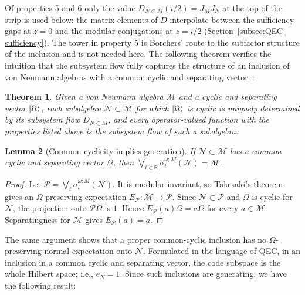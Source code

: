 \documentclass[a4paper,11pt]{article}
\newtheorem{theorem}{Theorem}
\newtheorem{lemma}[theorem]{Lemma}
\theoremstyle{definition}
\newcommand{\mP}{\mathcal{P}}
\begin{document}
Of properties 5 and 6 only the value $D_{N\subset M}(i/2)=J_MJ_N$ at the top of the strip is used below: the matrix elements of $D$ interpolate between the sufficiency gaps at $z=0$ and the modular conjugations at $z=i/2$ (Section~\ref{subsec:QEC-sufficiency}). The tower in property 5 is Borchers' route to the subfactor structure of the inclusion and is not needed here. The following theorem verifies the intuition that the subsystem flow fully captures the structure of an inclusion of von Neumann algebras with a common cyclic and separating vector~\cite{revolutionizing}:
\begin{theorem}
    Given a von Neumann algebra $\mathcal M$ and a cyclic and separating vector $\ket{\Omega}$, each subalgebra $\mathcal N\subset\mathcal M$ for which $\ket{\Omega}$ is cyclic is uniquely determined by its subsystem flow $D_{N\subset M}$, and every operator-valued function with the properties listed above is the subsystem flow of such a subalgebra.
\end{theorem}

\begin{lemma}[Common cyclicity implies generation]\label{lem:common-cyclicity-generating}
If $\mathcal N\subset\mathcal M$ has a common cyclic and separating vector $\Omega$, then
$\bigvee_{t\in\mathbb R}\sigma^{\omega;M}_t(\mathcal N)=\mathcal M$.
\end{lemma}
\begin{proof}
Let $\mP=\bigvee_t\sigma^{\omega;M}_t(\mathcal N)$. It is modular invariant, so Takesaki's theorem
gives an $\Omega$-preserving expectation $E_{\mP}:\mathcal M\to\mP$.
Since $\mathcal N\subset\mP$ and $\Omega$ is cyclic for $\mathcal N$, the projection onto
$\overline{\mP\Omega}$ is $1$. Hence $E_{\mP}(a)\Omega=a\Omega$ for every $a\in\mathcal M$.
Separatingness for $\mathcal M$ gives $E_{\mP}(a)=a$.
\end{proof}
The same argument shows that a proper common-cyclic inclusion has no
$\Omega$-preserving normal expectation onto $\mathcal N$. Formulated in the language of QEC, in an inclusion in a common cyclic and separating vector, the code subspace is the whole Hilbert space; i.e., $e_N=1$. Since such inclusions are generating, we have the following result:
\end{document}
